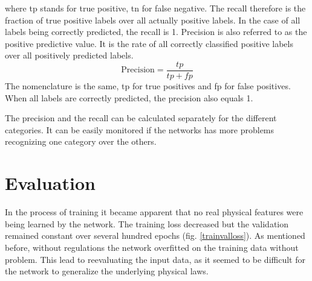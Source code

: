 where tp stands for true positive, tn for false negative. The recall therefore is the fraction of true positive labels over all actually positive labels. In the case of all labels being correctly predicted, the recall is 1. Precision is also referred to as the positive predictive value. It is the rate of all correctly classified positive labels over all positively predicted labels.
\begin{equation}
\mathrm{Precision} = \frac{tp}{tp + fp}
\end{equation}
The nomenclature is the same, tp for true positives and fp for false positives. When all labels are correctly predicted, the precision also equals 1.

The precision and the recall can be calculated separately for the different categories. It can be easily monitored if the networks has more problems recognizing one category over the others. 

\section{Evaluation}
In the process of training it became apparent that no real physical features were being learned by the network. The training loss decreased but the validation remained constant over several hundred epochs (fig. \ref{trainvalloss}). As mentioned before, without  regulations the network overfitted on the training data without problem. This lead to reevaluating the input data, as it seemed to be difficult for the network to generalize the underlying physical laws. 

